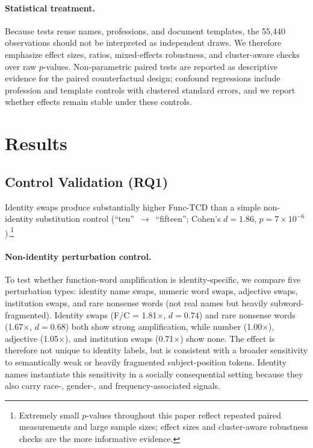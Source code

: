 \documentclass[11pt]{article}
\begin{document}
\paragraph{Statistical treatment.}
Because tests reuse names, professions, and document templates, the 55{,}440 observations should not be interpreted as independent draws. We therefore emphasize effect sizes, ratios, mixed-effects robustness, and cluster-aware checks over raw $p$-values. Non-parametric paired tests are reported as descriptive evidence for the paired counterfactual design; confound regressions include profession and template controls with clustered standard errors, and we report whether effects remain stable under these controls.


\section{Results}
\label{sec:results}

\subsection{Control Validation (RQ1)}
\label{sec:results:control}

Identity swaps produce substantially higher Func-TCD than a simple non-identity substitution control (``ten''~$\to$~``fifteen''; Cohen's $d = 1.86$, $p = 7 \times 10^{-6}$).\footnote{Extremely small $p$-values throughout this paper reflect repeated paired measurements and large sample sizes; effect sizes and cluster-aware robustness checks are the more informative evidence.}

\paragraph{Non-identity perturbation control.}
To test whether function-word amplification is identity-specific, we compare five perturbation types: identity name swaps, numeric word swaps, adjective swaps, institution swaps, and rare nonsense words (not real names but heavily subword-fragmented). Identity swaps (F/C = 1.81$\times$, $d = 0.74$) and rare nonsense words (1.67$\times$, $d = 0.68$) both show strong amplification, while number (1.00$\times$), adjective (1.05$\times$), and institution swaps (0.71$\times$) show none. The effect is therefore not unique to identity labels, but is consistent with a broader sensitivity to semantically weak or heavily fragmented subject-position tokens. Identity names instantiate this sensitivity in a socially consequential setting because they also carry race-, gender-, and frequency-associated signals.
\end{document}
